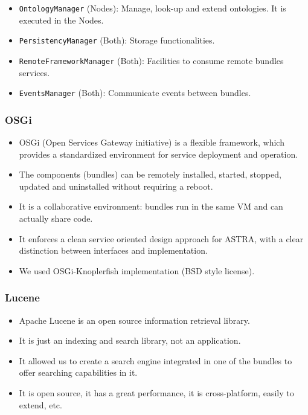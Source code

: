 \begin{frame}

	\begin{itemize}
	  \item \texttt{OntologyManager} (Nodes): Manage, look-up
	  and extend ontologies. It is executed in the Nodes.
	  \item \texttt{PersistencyManager} (Both): Storage functionalities.
	  \item \texttt{RemoteFrameworkManager} (Both): Facilities to consume remote
	  bundles services.
	  \item \texttt{EventsManager} (Both): Communicate events between bundles. 
	\end{itemize}


\end{frame}

\begin{frame}

	\frametitle{OSGi} 
	
	\begin{itemize}
	  \item OSGi (Open Services Gateway initiative) is a  flexible framework,
	  which provides a standardized environment for service deployment and operation.
	  \item The components (bundles) can be remotely installed, started, stopped,
	  updated and uninstalled without requiring a reboot.
	  \item It is a collaborative environment: bundles run in the same VM and can
	  actually share code.
	  \item It enforces a clean service oriented design approach for ASTRA, with a
	  clear distinction between interfaces and implementation.
	  \item We used OSGi-Knoplerfish implementation (BSD style license).
	\end{itemize}


\end{frame}

\begin{frame}

	\frametitle{Lucene} 
	
	\begin{itemize}
	  \item Apache Lucene is an open source information retrieval library.
	  \item It is just an indexing and search library, not an application.
	  \item It allowed us to create a search engine integrated in one of the
			bundles to offer searching capabilities in it.
	  \item It is open source, it has a great performance, it is cross-platform,
	  easily to extend, etc.
	\end{itemize}


\end{frame}


